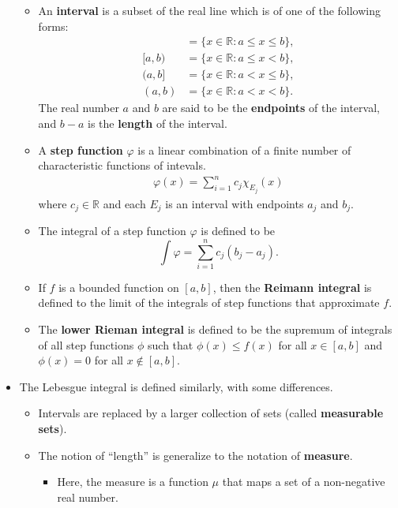 \documentclass[10pt]{article}
\newcommand{\Real}{\mathbb{R}}
\begin{document}
\begin{itemize}
\begin{itemize}
    \item An {\bf interval} is a subset of the real line which is of one of the following forms:
    \begin{align*}
        [a,b] &= \{ x \in \Real: a \leq x \leq b \}, \\
        [a,b) &= \{ x \in \Real: a \leq x < b \}, \\
        (a,b] &= \{ x \in \Real: a < x \leq b \}, \\
        (a,b) &= \{ x \in \Real: a < x < b \}.
    \end{align*}
    The real number $a$ and $b$ are said to be the {\bf endpoints} of the interval, and $b-a$ is the {\bf length} of the interval.
      
    \item A {\bf step function} $\varphi$ is a linear combination of a finite number of characteristic functions of intevals.
    \begin{align*}
        \varphi(x) = \sum_{i=1}^n c_j \chi_{E_j}(x)
    \end{align*}
    where $c_j \in \Real$ and each $E_j$ is an interval with endpoints $a_j$ and $b_j$. 

    \item The integral of a step function $\varphi$ is defined to be $$ \int \varphi = \sum_{i=1}^n c_j(b_j - a_j).$$
    
    \item If $f$ is a bounded function on $[a,b]$, then the {\bf Reimann integral} is defined to the limit of the integrals of step functions that approximate $f$.
    
    \item The {\bf lower Rieman integral} is defined to be the supremum of integrals of all step functions $\phi$ such that $\phi(x) \leq f(x)$ for all $x \in [a,b]$ and $\phi(x) = 0$ for all $x \not\in [a,b]$.
  \end{itemize}

  \item The Lebesgue integral is defined similarly, with some differences.
  \begin{itemize}
    \item Intervals are replaced by a larger collection of sets (called {\bf measurable sets}).
    
    \item The notion of ``length'' is generalize to the notation of {\bf measure}.
    \begin{itemize}
      \item Here, the measure is a function $\mu$ that maps a set of a non-negative real number.
    \end{itemize}
    

\end{itemize}
\end{itemize}
\end{document}
